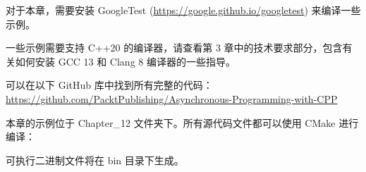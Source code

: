 对于本章，需要安装 GoogleTest (\url{https://google.github.io/googletest}) 来编译一些示例。

一些示例需要支持 C++20 的编译器，请查看第 3 章中的技术要求部分，包含有关如何安装 GCC 13 和 Clang 8 编译器的一些指导。

可以在以下 GitHub 库中找到所有完整的代码： \url{https://github.com/PacktPublishing/Asynchronous-Programming-with-CPP}

本章的示例位于 Chapter\_12 文件夹下。所有源代码文件都可以使用 CMake 进行编译：


可执行二进制文件将在 bin 目录下生成。
